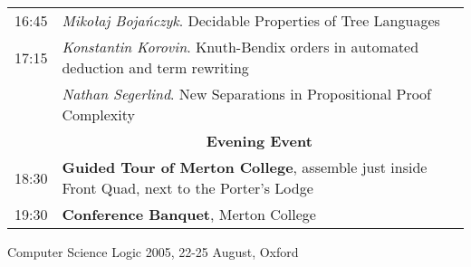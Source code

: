 \documentclass[landscape,12pt]{article}
\begin{document}
\begin{tabular}{p{1cm}p{21cm}}
16:45 &	\emph{Miko\l aj Boja\'nczyk}. Decidable Properties of Tree Languages\\
17:15 &	\emph{Konstantin Korovin}. Knuth-Bendix orders in automated deduction and term rewriting\\
& \emph{Nathan Segerlind}.
New Separations in Propositional Proof Complexity\\
\hline
	& \multicolumn{1}{c}{\textbf{Evening Event}}\\
\hline
18:30 & \textbf{Guided Tour of Merton College}, assemble just inside
Front Quad, next to the Porter's Lodge\\ 19:30 & \textbf{Conference
Banquet}, Merton College\\
\end{tabular}

\newpage
\begin{center}
\LARGE\sc Computer Science Logic 2005, 22-25 August, Oxford
\end{center}
\end{document}
